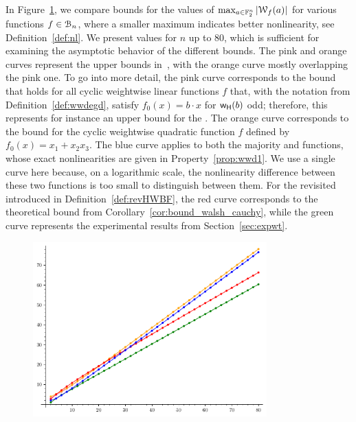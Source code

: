 \documentclass{llncs}
\begin{document}
In Figure~\ref{fig:walsh_bound_comparison}, we compare bounds for the values of $\max_{a \in \mathbb{F}_2^n} |\mathcal W_{f}(a)|$ for various functions $f\in\mathcal{B}_n$, where a smaller maximum indicates better nonlinearity, see Definition~\ref{def:nl}. We present values for $n$ up to $80$, which is sufficient for examining the asymptotic behavior of the different bounds. The pink and orange curves represent the upper bounds  in~\cite{DAM:MeaOza24}, with the orange curve mostly overlapping the pink one. To go into more detail, the pink curve corresponds to the bound that holds for all cyclic weightwise linear functions $f$ that, with the notation from Definition~\ref{def:wwdegd}, satisfy $ f_0(x) = b \cdot x $ for $\mathsf{w_H}(b)$ odd; therefore, this represents for instance an upper bound for the \hwbf{}. The orange curve corresponds to the bound for the cyclic weightwise quadratic function $f$ defined by $f_0(x) = x_1 + x_2 x_3$. The blue curve applies to both the majority and \hwbf{} functions, whose exact nonlinearities are given in Property~\ref{prop:wwd1}. We use a single curve here because, on a logarithmic scale, the nonlinearity difference between these two functions is too small to distinguish between them. For the revisited \hwbf{} introduced in Definition~\ref{def:revHWBF}, the red curve corresponds to the theoretical bound from Corollary~\ref{cor:bound_walsh_cauchy}, while the green curve represents the experimental results from Section~\ref{sec:expwt}.

\begin{figure}
	\centering
	\includegraphics[width=9cm]{comparison_walsh_bound.pdf}
	\label{fig:walsh_bound_comparison}
\end{figure}
\end{document}
